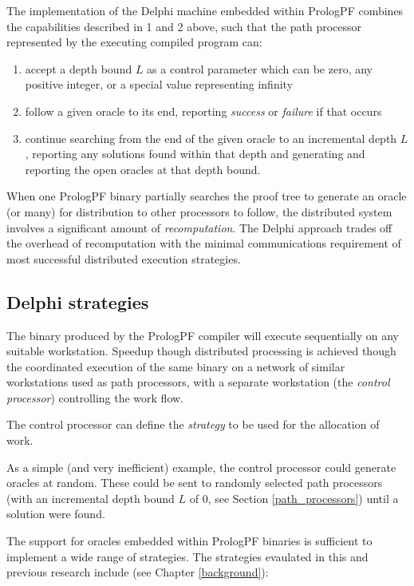 The implementation of the Delphi machine embedded within PrologPF combines the
capabilities described in 1 and 2 above, such that the path processor represented
by the executing compiled program can:
\begin{enumerate}
\item{accept a depth bound $L$ as a control parameter which can be zero, any
  positive integer, or a special value representing infinity}
\item{follow a given oracle to its end, reporting \textit{success} or
  \textit{failure} if that occurs}
\item{continue searching from the end of the given oracle to an incremental
  depth $L$, reporting any solutions found within that depth and generating
  and reporting the open oracles at that depth bound.}
\end{enumerate}

When one PrologPF binary partially searches the proof tree to generate
an oracle (or many) for distribution to other processors to follow,
the distributed system involves a significant amount 
of \textit{recomputation}.
The Delphi approach trades off the overhead of recomputation with the minimal
communications requirement of most successful distributed execution
strategies.

\subsection{Delphi strategies}
\label{delphi_strategies}

The binary produced by the PrologPF compiler will execute sequentially on
any suitable workstation.  Speedup though distributed processing is
achieved though the coordinated execution of the same binary on a network
of similar workstations used as path processors, with a separate
workstation (the \textit{control processor}) controlling the work flow.

The control processor can define the \textit{strategy} to be used for
the allocation of work.

As a simple (and very inefficient) example, the control processor could
generate oracles at random.  These could be sent to randomly selected
path processors (with an incremental depth bound $L$ of 0, see Section
\ref{path_processors}) until a solution were found.

The support for oracles embedded within PrologPF binaries is sufficient to
implement a wide range of strategies.  The strategies evaulated in this and
previous research include (see Chapter \ref{background}):

